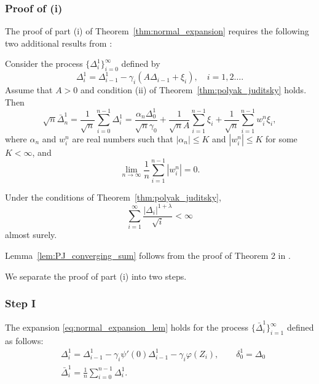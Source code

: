 \subsubsection*{Proof of (i)}
The proof of part (i) of Theorem~\ref{thm:normal_expansion} requires the following two additional results from \cite{polyak1992acceleration}:
\begin{lem}{\cite[Lem. 2]{polyak1992acceleration}}
\label{lem:Polyak_expansion}
Consider the process $\{\Delta_i^1 \}_{i=0}^\infty$ defined by
\[
\Delta^1_i = \Delta^1_{i-1} - \gamma_i (A \Delta_{i-1}+ \xi_i),\quad i=1,2\ldots.
\]
Assume that $A>0$ and condition (ii) of Theorem~\ref{thm:polyak_juditsky} holds. Then 
\begin{equation}
\label{eq:Polyak_expansion}
\sqrt{n} \bar{\Delta}_n^1 = \frac{1}{\sqrt{n}}\sum_{i=0}^{n-1} \Delta_i^1 = \frac{\alpha_n \Delta_0^1}{\sqrt{n} \gamma_0}  + \frac{1}{\sqrt{n} A} \sum_{i=1}^{n-1} \xi_i + \frac{1}{\sqrt{n}}\sum_{i=1}^{n-1} w_i^n \xi_i,
\end{equation}
where $\alpha_n$ and $w_i^n$ are real numbers such that $|\alpha_n| \leq K$ and $|w_i^n|\leq K$ for some $K< \infty$, and 
\[
\lim_{n\to \infty} \frac{1}{n} \sum_{i=1}^{n-1} |w_i^n| = 0. 
\]
\end{lem} 

\begin{lem} \label{lem:PJ_converging_sum}
Under the conditions of Theorem~\ref{thm:polyak_juditsky},
\[
\sum_{i=1}^\infty \frac{|\Delta_{i}|^{1+\lambda}}{\sqrt{i}} < \infty 
\]
almost surely. 
\end{lem}
Lemma~\ref{lem:PJ_converging_sum} follows from the proof of Theorem 2 in \cite{polyak1992acceleration}. 

We separate the proof of part (i) into two steps.
\subsubsection*{Step I}
The expansion \eqref{eq:normal_expansion_lem} holds for the process  $\{\bar{\Delta}^1_i\}_{i=1}^\infty$ defined as follows:
\begin{align} \label{eq:Polyak_expansion_lem1_alg}
& \Delta_i^1  = \Delta_{i-1}^1 - \gamma_i \psi'(0) \Delta_{i-1}^1 - \gamma_i \varphi(Z_i), \qquad
 \delta_0^1 = \Delta_0\\
& \bar{\Delta}^1_i = \frac{1}{n}\sum_{i=0}^{n-1} \Delta^1_i.
\end{align}

